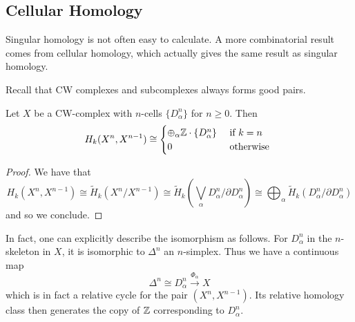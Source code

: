 \documentclass[a4paper]{article}
\begin{document}
\subsection{Cellular Homology}
Singular homology is not often easy to calculate. A more combinatorial result comes from cellular homology, which actually gives the same result as singular homology. 

Recall that CW complexes and subcomplexes always forms good pairs. 

\begin{lmm}{}{} Let $X$ be a CW-complex with $n$-cells $\{D_\alpha^n\}$ for $n\geq 0$. Then $$H_k(X^n,X^{n-1})\cong\begin{cases}
\oplus_\alpha\mathbb{Z}\cdot\{D_\alpha^n\} & \text{ if } k=n\\
0 & \text{ otherwise }
\end{cases}$$ \tcbline
\begin{proof}
We have that $$H_k(X^n,X^{n-1})\cong\widetilde{H}_k(X^n/X^{n-1})\cong\widetilde{H}_k\left(\bigvee_\alpha D_\alpha^n/\partial D_\alpha^n\right)\cong\bigoplus_\alpha\widetilde{H}_k(D_\alpha^n/\partial D_\alpha^n)$$ and so we conclude. 
\end{proof}
\end{lmm}

In fact, one can explicitly describe the isomorphism as follows. For $D_\alpha^n$ in the $n$-skeleton in $X$, it is isomorphic to $\Delta^n$ an $n$-simplex. Thus we have a continuous map $$\Delta^n\cong D_\alpha^n\overset{\Phi_\alpha}{\longrightarrow}X$$ which is in fact a relative cycle for the pair $(X^n,X^{n-1})$. Its relative homology class then generates the copy of $\mathbb{Z}$ corresponding to $D_\alpha^n$. 
\end{document}
